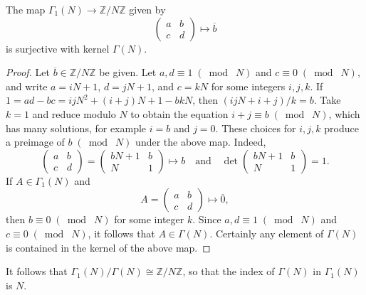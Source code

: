 \documentclass[10pt,leqno]{article}
\newcommand{\smod}[1]{\;(\bmod\; #1)}
\begin{document}
The map $\varGamma_1(N)\to \mathbb{Z}/N\mathbb{Z}$ given by \[\begin{pmatrix}
    a & b \\ c & d
\end{pmatrix}\mapsto \overline b\] is surjective with kernel $\varGamma(N)$. 
\begin{proof}
    Let $\overline b\in\mathbb{Z}/N\mathbb{Z}$ be given. Let $a,d\equiv 1\smod N$ and $c\equiv 0\smod N$, and write $a= iN+1$, $d = jN+1$, and $c = kN$ for some integers $i,j,k$. If $1= ad-bc = ijN^2 + (i+j)N + 1 - bkN$, then $(ijN+ i + j)/k = b$. Take $k=1$ and reduce modulo $N$ to obtain the equation $i+j\equiv b \smod N$, which has many solutions, for example $i = b$ and $j =0$. These choices for $i,j,k$ produce a preimage of $b\smod N$ under the above map. Indeed, \[\begin{pmatrix}
        a & b \\ c & d
    \end{pmatrix} = \begin{pmatrix}
        bN+1 & b \\ N & 1
    \end{pmatrix}\mapsto b\quad\text{and}\quad \det\begin{pmatrix}
        bN+1 & b \\ N & 1
    \end{pmatrix} = 1.\]
    If $A\in \varGamma_1(N)$ and \[A = \begin{pmatrix}
        a & b \\ c & d
    \end{pmatrix}\mapsto \overline 0,\] then $b \equiv 0\smod N$ for some integer $k$. Since $a,d\equiv 1\smod N$ and $c\equiv 0\smod N$, it follows that $A\in \varGamma(N)$. Certainly any element of $\varGamma(N)$ is contained in the kernel of the above map.
\end{proof} 
It follows that $\varGamma_1(N)/\varGamma(N)\cong \mathbb{Z}/N\mathbb{Z}$, so that the index of $\varGamma(N)$ in $\varGamma_1(N)$ is $N$.
\end{document}
